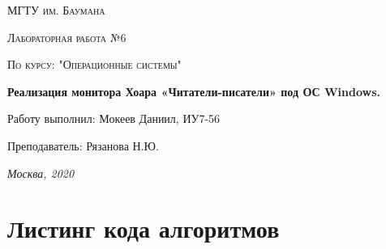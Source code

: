 \documentclass[12pt]{report}
\begin{document}
\begin{titlepage}
	\centering
	{\scshape\LARGE МГТУ им. Баумана \par}
	\vspace{3cm}
	{\scshape\Large Лабораторная работа №6\par}
	\vspace{0.5cm}	
	{\scshape\Large По курсу: "Операционные системы"\par}
	\vspace{1.5cm}
	\centering
	 {\huge\bfseries Реализация монитора Хоара «Читатели-писатели» под ОС Windows.\par}
	\vspace{2cm}
	\Large Работу выполнил: Мокеев Даниил, ИУ7-56\par
	\vspace{0.5cm}
	\Large Преподаватель:  Рязанова Н.Ю.\par

	\vfill
	\large \textit {Москва, 2020} \par
\end{titlepage}


\newpage

\section{Листинг кода алгоритмов}
\end{document}
